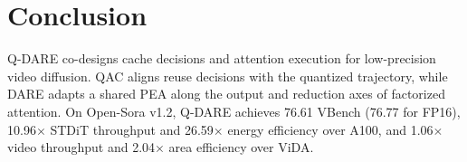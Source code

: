 \documentclass[conference]{IEEEtran}
\begin{document}
\section{Conclusion}
\label{sec:conclusion}

Q-DARE co-designs cache decisions and attention execution for low-precision video diffusion. QAC aligns reuse decisions with the quantized trajectory, while DARE adapts a shared PEA along the output and reduction axes of factorized attention. On Open-Sora v1.2, Q-DARE achieves 76.61 VBench
(76.77 for FP16), 10.96$\times$ STDiT throughput and
26.59$\times$ energy efficiency over A100, and
1.06$\times$ video throughput and 2.04$\times$ area
efficiency over ViDA.

\clearpage


\end{document}
